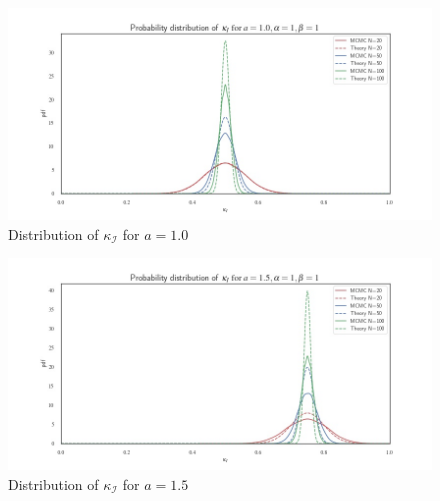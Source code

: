 \documentclass[11pt]{article}
\begin{document}
\begin{figure}[H]
	\centering
	\includegraphics[width=0.8\columnwidth]{aa4.jpg}
	\caption{Distribution of $\kappa_\mathcal{I}$ for $a=1.0$}
	\label{fig:aa4}
\end{figure}
\begin{figure}[H]
	\centering
	\includegraphics[width=0.8\columnwidth]{aa5.jpg}
	\caption{Distribution of $\kappa_\mathcal{I}$ for $a=1.5$}
	\label{fig:aa5}
\end{figure}


\appendix
\end{document}
